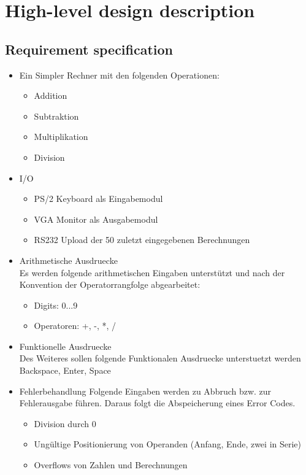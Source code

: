 \section{High-level design description}
\subsection{Requirement specification}
\begin{itemize}
 \item Ein Simpler Rechner mit den folgenden Operationen:
	\begin{itemize}
	 \item Addition
	 \item Subtraktion
	 \item Multiplikation
	 \item Division
	\end{itemize}
 \item I/O
 	\begin{itemize}
 	 \item PS/2 Keyboard als Eingabemodul
 	 \item VGA Monitor als Ausgabemodul
 	 \item RS232 Upload der 50 zuletzt eingegebenen Berechnungen
 	\end{itemize}
 \item Arithmetische Ausdruecke\\
	Es werden folgende arithmetischen Eingaben unterstützt und nach der Konvention
		der Operatorrangfolge abgearbeitet:
 	\begin{itemize}
 	 \item Digits:     0...9
 	 \item Operatoren: +, -, *, /
 	\end{itemize}
 \item Funktionelle Ausdruecke\\
 	Des Weiteres sollen folgende Funktionalen Ausdruecke unterstuetzt werden\\
 	 Backspace, Enter, Space
 \item Fehlerbehandlung
	Folgende Eingaben werden zu Abbruch bzw. zur Fehlerausgabe führen. Daraus folgt die Abspeicherung 
		eines Error Codes.
	\begin{itemize}
 	 \item Division durch 0
	 \item Ungültige Positionierung von Operanden (Anfang, Ende, zwei in Serie)
	 \item Overflows von Zahlen und Berechnungen
	\end{itemize}

\end{itemize}



